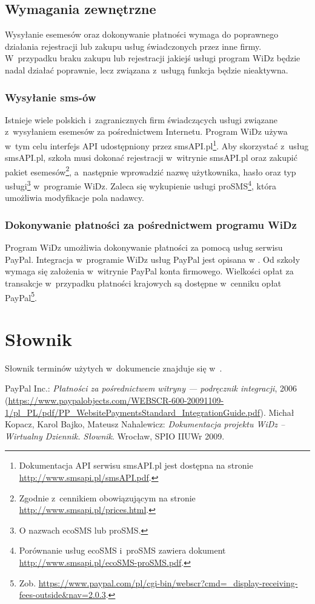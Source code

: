 \documentclass[12pt,leqno,twoside]{mwart}
\begin{document}
\subsection{Wymagania zewnętrzne}
\noindent Wysyłanie esemesów oraz dokonywanie płatności wymaga do poprawnego działania rejestracji lub zakupu usług świadczonych przez inne firmy. W~przypadku braku zakupu lub rejestracji jakiejś usługi program WiDz będzie nadal działać poprawnie, lecz związana z~usługą funkcja będzie nieaktywna.

\subsubsection{Wysyłanie sms-ów}\label{WYSYLANIE_SMS}
\noindent Istnieje wiele polskich i~zagranicznych firm świadczących usługi związane z~wysyłaniem esemesów za pośrednictwem Internetu. Program WiDz używa w~tym celu interfejs API udostępniony przez smsAPI.pl\footnote{Dokumentacja API serwisu smsAPI.pl jest dostępna na stronie \url{http://www.smsapi.pl/smsAPI.pdf}.}. Aby skorzystać z~usług smsAPI.pl, szkoła musi dokonać rejestracji w~witrynie smsAPI.pl oraz zakupić pakiet esemesów\footnote{Zgodnie z~cennikiem obowiązującym na stronie \url{http://www.smsapi.pl/prices.html}.}, a~następnie wprowadzić nazwę użytkownika, hasło oraz typ usługi\footnote{O nazwach ecoSMS lub proSMS.} w~programie WiDz. Zaleca się wykupienie usługi proSMS\footnote{Porównanie usług ecoSMS i~proSMS zawiera dokument \hbox{\url{http://www.smsapi.pl/ecoSMS-proSMS.pdf}}.}, która umożliwia modyfikacje pola nadawcy.

\subsubsection{Dokonywanie płatności za pośrednictwem programu WiDz}\label{PLATNOSCI_WIDZ}
\noindent Program WiDz umożliwia dokonywanie płatności za pomocą usług serwisu PayPal. Integracja w~programie WiDz usług PayPal jest opisana w \cite{PAYPAL}. Od szkoły wymaga się założenia w~witrynie PayPal konta firmowego. Wielkości opłat za transakcje w~przypadku płatności krajowych są dostępne w~cenniku opłat PayPal\footnote{Zob. \url{https://www.paypal.com/pl/cgi-bin/webscr?cmd=_display-receiving-fees-outside&nav=2.0.3}.}.

\section{Słownik}
\noindent Słownik terminów użytych w~dokumencie znajduje się w~\cite{SLO}.

\begin{thebibliography}{9}
	 PayPal Inc.: {\it Płatności za pośrednictwem witryny — podręcznik integracji}, 2006 (\url{https://www.paypalobjects.com/WEBSCR-600-20091109-1/pl_PL/pdf/PP_WebsitePaymentsStandard_IntegrationGuide.pdf}).
	 Michał Kopacz, Karol Bajko, Mateusz Nahalewicz: {\it Dokumentacja projektu WiDz -- Wirtualny Dziennik. Słownik}. Wrocław, SPIO IIUWr 2009.
\end{thebibliography}
\end{document}

